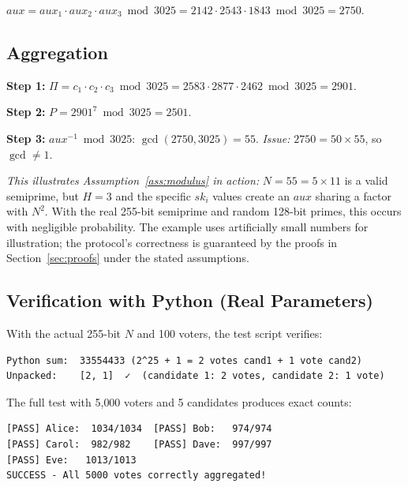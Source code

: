 \documentclass[11pt, a4paper]{article}
\begin{document}
$aux = aux_1 \cdot aux_2 \cdot aux_3 \bmod 3025 = 2142 \cdot 2543 \cdot 1843 \bmod 3025 = 2750$.

\subsection{Aggregation}

\textbf{Step 1:} $\Pi = c_1 \cdot c_2 \cdot c_3 \bmod 3025 = 2583 \cdot 2877 \cdot 2462 \bmod 3025 = 2901$.

\textbf{Step 2:} $P = 2901^7 \bmod 3025 = 2501$.

\textbf{Step 3:} $aux^{-1} \bmod 3025$: $\gcd(2750, 3025) = 55$. \textit{Issue:} $2750 = 50 \times 55$, so $\gcd \neq 1$.

\textit{This illustrates Assumption~\ref{ass:modulus} in action:} $N = 55 = 5 \times 11$ is a valid semiprime, but $H = 3$ and the specific $sk_i$ values create an $aux$ sharing a factor with $N^2$. With the real 255-bit semiprime and random 128-bit primes, this occurs with negligible probability. The example uses artificially small numbers for illustration; the protocol's correctness is guaranteed by the proofs in Section~\ref{sec:proofs} under the stated assumptions.

\subsection{Verification with Python (Real Parameters)}

With the actual 255-bit $N$ and 100 voters, the test script verifies:
\begin{verbatim}
Python sum:  33554433 (2^25 + 1 = 2 votes cand1 + 1 vote cand2)
Unpacked:    [2, 1]  ✓  (candidate 1: 2 votes, candidate 2: 1 vote)
\end{verbatim}

The full test with 5{,}000 voters and 5 candidates produces exact counts:
\begin{verbatim}
[PASS] Alice:  1034/1034  [PASS] Bob:   974/974
[PASS] Carol:  982/982    [PASS] Dave:  997/997
[PASS] Eve:   1013/1013
SUCCESS - All 5000 votes correctly aggregated!
\end{verbatim}
\end{document}
